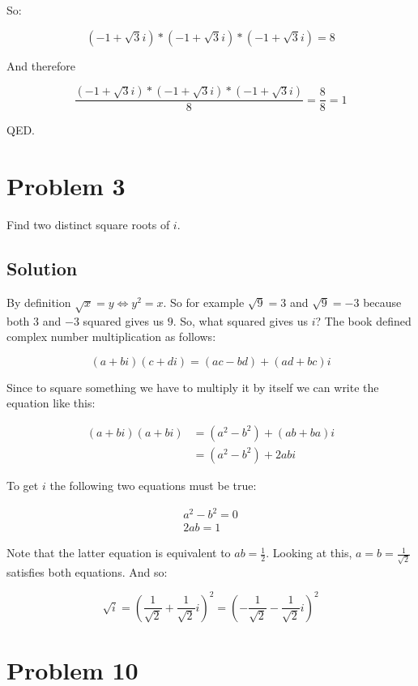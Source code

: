 \documentclass{article}
\begin{document}
So:

\[\left(-1 + \sqrt{3}i\right) * \left(-1 + \sqrt{3}i\right) *
\left(-1 + \sqrt{3}i\right)=8\]

And therefore

\[\frac{\left(-1 + \sqrt{3}i\right) * \left(-1 + \sqrt{3}i\right) *
\left(-1 + \sqrt{3}i\right)}{8}=\frac{8}{8}=1\]

QED.

\section*{Problem 3}

Find two distinct square roots of $i$.

\subsection*{Solution}

By definition $\sqrt{x}=y\iff y^2=x$. So for example $\sqrt{9}=3$ and $\sqrt{9}=-3$ because both $3$ and $-3$ squared gives us $9$. So, what squared gives us $i$? The book defined complex number multiplication as follows:

\[\left(a+bi\right)\left(c+di\right)=\left(ac-bd\right)+\left(ad+bc\right)i\]

Since to square something we have to multiply it by itself we can write the equation like this:

\begin{align*}
  \left(a+bi\right)\left(a+bi\right) &= \left(a^2-b^2\right)+\left(ab+ba\right)i \\
&= \left(a^2-b^2\right)+2abi
\end{align*}

To get $i$ the following two equations must be true:

\begin{align*}
  a^2-b^2=0 \\
  2ab=1
\end{align*}

Note that the latter equation is equivalent to $ab=\frac{1}{2}$. Looking at this, $a=b=\frac{1}{\sqrt{2}}$ satisfies both equations. And so:

\[\sqrt{i}=\left( \frac{1}{\sqrt{2}} + \frac{1}{\sqrt{2}}i \right)^2=\left( -\frac{1}{\sqrt{2}} - \frac{1}{\sqrt{2}}i \right)^2\]

\newpage

\section*{Problem 10}
\end{document}
